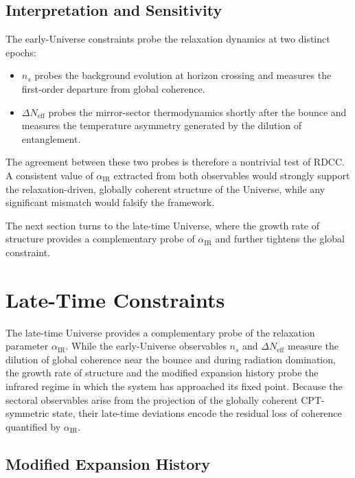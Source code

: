 \documentclass[11pt,a4paper]{article}
\begin{document}
\subsection{Interpretation and Sensitivity}

The early-Universe constraints probe the relaxation dynamics at two distinct epochs:

\begin{itemize}
    \item $n_s$ probes the background evolution at horizon crossing and measures the first-order
    departure from global coherence.
    \item $\Delta N_{\mathrm{eff}}$ probes the mirror-sector thermodynamics shortly after the bounce
    and measures the temperature asymmetry generated by the dilution of entanglement.
\end{itemize}

The agreement between these two probes is therefore a nontrivial test of RDCC. A consistent
value of $\alpha_{\mathrm{IR}}$ extracted from both observables would strongly support the
relaxation-driven, globally coherent structure of the Universe, while any significant mismatch
would falsify the framework.

The next section turns to the late-time Universe, where the growth rate of structure provides a
complementary probe of $\alpha_{\mathrm{IR}}$ and further tightens the global constraint.

\section{Late-Time Constraints}

The late-time Universe provides a complementary probe of the relaxation parameter
$\alpha_{\mathrm{IR}}$. While the early-Universe observables $n_s$ and $\Delta N_{\mathrm{eff}}$ measure the
dilution of global coherence near the bounce and during radiation domination, the growth rate
of structure and the modified expansion history probe the infrared regime in which the system
has approached its fixed point. Because the sectoral observables arise from the projection of the
globally coherent CPT-symmetric state, their late-time deviations encode the residual loss of
coherence quantified by $\alpha_{\mathrm{IR}}$.

\subsection{Modified Expansion History}
\end{document}
